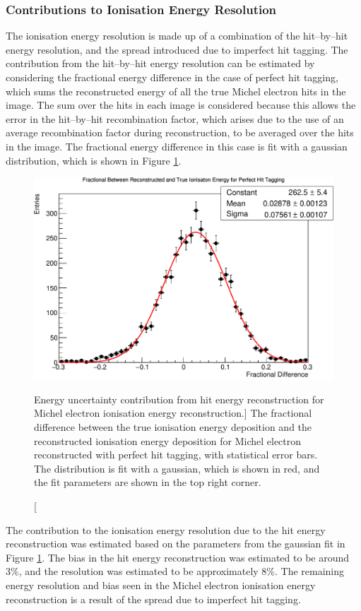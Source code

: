 \subsubsection*{Contributions to Ionisation Energy Resolution}
The ionisation energy resolution is made up of a combination of the hit--by--hit
energy resolution, and the spread introduced due to imperfect hit tagging. The
contribution from the hit--by--hit energy resolution can be estimated by
considering the fractional energy difference in the case of perfect hit tagging,
which sums the reconstructed energy of all the true Michel electron hits in
the image. The sum over the hits in each image is considered because this
allows the error in the hit--by--hit recombination factor, which arises due to
the use of an average recombination factor during reconstruction, to be
averaged over the hits in the image. The fractional energy difference in this
case is fit with a gaussian distribution, which is shown in Figure
\ref{fig:michel_hit_res}.
\begin{figure}
	\centering
	\includegraphics[width=\textwidth]{figures/michel_hit_energy_resolution.pdf}
	\caption
	[Energy uncertainty contribution from hit energy reconstruction for Michel
	electron ionisation energy reconstruction.]
	{The fractional difference between the true ionisation energy deposition and
	the reconstructed ionisation energy deposition for Michel electron
	reconstructed with perfect hit tagging, with statistical error bars. The
	distribution is fit with a gaussian, which is shown in red, and the fit
	parameters are shown in the top right corner.}
	\label{fig:michel_hit_res}
\end{figure}

The contribution to the ionisation energy resolution due to the hit energy
reconstruction was estimated based on the parameters from the gaussian fit in
Figure \ref{fig:michel_hit_res}. The bias in the hit energy reconstruction was
estimated to be around 3\%, and the resolution was estimated to be
approximately 8\%. The remaining energy resolution and bias seen in the Michel
electron ionisation energy reconstruction is a result of the spread due to
imperfect hit tagging.

